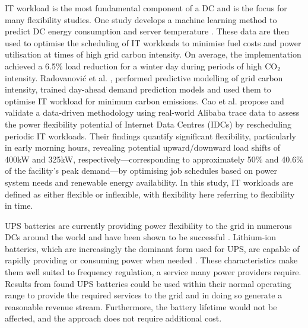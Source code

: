 \documentclass[lettersize,journal]{IEEEtran}
\begin{document}
IT workload is the most fundamental component of a DC and is the focus for many flexibility studies. One study develops a machine learning method to predict DC energy consumption and server temperature \cite{Misaghian2023TIA}. These data are then used to optimise the scheduling of IT workloads to minimise fuel costs and power utilisation at times of high grid carbon intensity. On average, the implementation achieved a 6.5\% load reduction for a winter day during periods of high CO$_2$ intensity. Radovanović et al. \cite{radovanovic2022carbon}, performed predictive modelling of grid carbon intensity, trained day-ahead demand prediction models and used them to optimise IT workload for minimum carbon emissions.
Cao et al. \cite{Cao2022ApEn} propose and validate a data-driven methodology using real-world Alibaba trace data to assess the power flexibility potential of Internet Data Centres (IDCs) by rescheduling periodic IT workloads. Their findings quantify significant flexibility, particularly in early morning hours, revealing potential upward/downward load shifts of 400kW and 325kW, respectively—corresponding to approximately 50\% and 40.6\% of the facility's peak demand—by optimising job schedules based on power system needs and renewable energy availability. In this study, IT workloads are defined as either flexible or inflexible, with flexibility here referring to flexibility in time.

UPS batteries are currently providing power flexibility to the grid in numerous DCs around the world and have been shown to be successful \cite{alapera2019fast,roach2022microsoft,Anghel_2023}. Lithium-ion batteries, which are increasingly the dominant form used for UPS, are capable of rapidly providing or consuming power when needed \cite{alapera2018data}. These characteristics make them well suited to frequency regulation, a service many power providers require. Results from \cite{alapera2018data} found UPS batteries could be used within their normal operating range to provide the required services to the grid and in doing so generate a reasonable revenue stream. Furthermore, the battery lifetime would not be affected, and the approach does not require additional cost.
\end{document}
